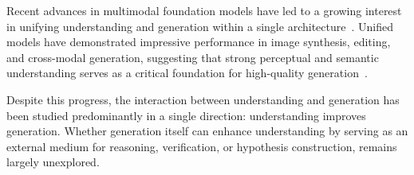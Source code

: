 \documentclass{article}
\theoremstyle{plain}
\theoremstyle{definition}
\theoremstyle{remark}
\begin{document}
    


Recent advances in multimodal foundation models have led to a growing interest in unifying understanding and generation within a single architecture~\cite{yang2025survey}. Unified models have demonstrated impressive performance in image synthesis, editing, and cross-modal generation, suggesting that strong perceptual and semantic understanding serves as a critical foundation for high-quality generation~\cite{zou2025unimmmu,xie2025mmeunify,li2025unieval}.

Despite this progress, the interaction between understanding and generation has been studied predominantly in a single direction: understanding improves generation. Whether generation itself can enhance understanding by serving as an external medium for reasoning, verification, or hypothesis construction, remains largely unexplored. 
\end{document}
